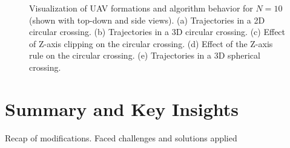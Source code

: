 \begin{figure}[H]
{                \label{fig:n_10_circle_z_rule}
            }
            \par\medskip
            \caption{
                Visualization of UAV formations and algorithm behavior for $N=10$ (shown with top-down and side views). 
                (a) Trajectories in a 2D circular crossing. 
                (b) Trajectories in a 3D circular crossing. 
                (c) Effect of Z-axis clipping on the circular crossing. 
                (d) Effect of the Z-axis rule on the circular crossing. 
                (e) Trajectories in a 3D spherical crossing.
            }
            \label{fig:trajectories}
        \end{figure}


            
\section{Summary and Key Insights}
    Recap of modifications. Faced challenges and solutions applied
